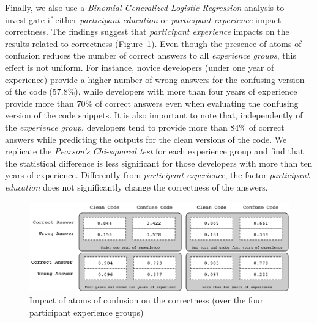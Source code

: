 Finally, we also use a \emph{Binomial Generalized Logistic Regression} analysis to investigate if either \emph{participant education} or \emph{participant experience} impact correctness. The findings suggest that \emph{participant experience} impacts on the results related to correctness (Figure~\ref{fig:correctness-over-experience}). Even though the presence of atoms of confusion reduces the number of correct answers to all \emph{experience groups}, this effect is not uniform. For instance, novice developers (under one year of experience) provide a higher number of wrong answers for the confusing version of the code (57.8\%), while developers with more than four years of experience provide more than 70\% of correct answers even when evaluating the confusing version of the code snippets. It is also important to note that, independently of the \emph{experience group}, developers tend to provide more than 84\% of correct answers while predicting the outputs for the clean versions of the code. We replicate the \emph{Pearson's Chi-squared test} for each experience group and find that the statistical difference is less significant for those developers with more than ten years of experience. Differently from \emph{participant experience}, the factor \emph{participant education} does not significantly change the correctness of the answers.

\begin{figure}
  \includegraphics[scale=0.3]{images/correctness-by-experience}
  \caption{Impact of atoms of confusion on the correctness (over the four participant experience groups)}
  \label{fig:correctness-over-experience}
\end{figure}



